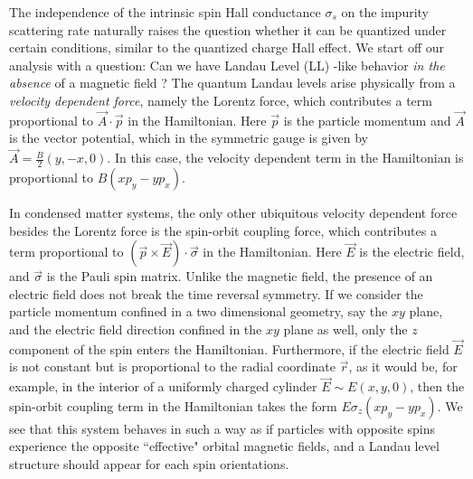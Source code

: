 \documentclass[prl,aps,amssymb,shownopacs,twocolumn]{revtex4}
\begin{document}
	The independence of the intrinsic spin Hall conductance $\sigma_s$
	on the impurity scattering rate naturally raises the question
	whether it can be quantized under certain conditions, similar to the
	quantized charge Hall effect. We start off our analysis with a
	question: Can we have Landau Level (LL) -like behavior \emph{in the
		absence} of a magnetic field \cite{haldane1988}? The quantum Landau
	levels arise physically from a {\it velocity dependent force},
	namely the Lorentz force, which contributes a term proportional to
	$\vec{A}\cdot \vec{p}$ in the Hamiltonian. Here $\vec{p}$ is the
	particle momentum and $\vec{A}$ is the vector potential, which in
	the symmetric gauge is given by $\vec{A} = \frac{B}{2}(y, -x,0)$. In
	this case, the velocity dependent term in the Hamiltonian is
	proportional to $B(xp_y-yp_x)$.
	
	In condensed matter systems, the only other ubiquitous velocity
	dependent force besides the Lorentz force is the spin-orbit coupling
	force, which contributes a term proportional to $(\vec{p} \times
	\vec{E})\cdot \vec{\sigma}$ in the Hamiltonian. Here $\vec{E}$ is
	the electric field, and $\vec{\sigma}$ is the Pauli spin matrix.
	Unlike the magnetic field, the presence of an electric field does
	not break the time reversal symmetry. If we consider the particle
	momentum confined in a two dimensional geometry, say the $xy$ plane,
	and the electric field direction confined in the $xy$ plane as well,
	only the $z$ component of the spin enters the Hamiltonian.
	Furthermore, if the electric field $\vec{E}$ is not constant but is
	proportional to the radial coordinate $\vec{r}$, as it would be, for
	example, in the interior of a uniformly charged cylinder $\vec{E}
	\sim E(x,y,0)$, then the spin-orbit coupling term in the Hamiltonian
	takes the form $E \sigma_z (xp_y-yp_x)$. We see that this system
	behaves in such a way as if particles with opposite spins experience
	the opposite ``effective" orbital magnetic fields, and a Landau
	level structure should appear for each spin orientations.
	
\end{document}
